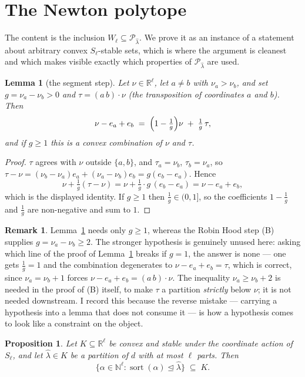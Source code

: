 \documentclass[11pt]{article}
\theoremstyle{plain}
\newtheorem{lem}[thm]{Lemma}
\newtheorem{prop}[thm]{Proposition}
\theoremstyle{definition}
\newtheorem{rem}[thm]{Remark}
\DeclareMathOperator{\srt}{sort}
\newcommand{\N}{\mathbb{N}}
\newcommand{\R}{\mathbb{R}}
\newcommand{\lhat}{\hat\lambda}
\newcommand{\Perm}{\mathcal{P}}
\begin{document}
\section{The Newton polytope}\label{sec:newton}

The content is the inclusion $W_\ell\subseteq\Perm_{\lhat}$. We prove it as an
instance of a statement about arbitrary convex $S_\ell$-stable sets, which is
where the argument is cleanest and which makes visible exactly which properties
of $\Perm_{\lhat}$ are used.

\begin{lem}[the segment step]\label{lem:segment}
Let $\nu\in\R^{\ell}$, let $a\ne b$ with $\nu_a>\nu_b$, and set
$g=\nu_a-\nu_b>0$ and $\tau=(a\,b)\cdot\nu$ (the transposition of coordinates
$a$ and $b$). Then
\[
  \nu-e_a+e_b\;=\;\Bigl(1-\tfrac{1}{g}\Bigr)\nu\;+\;\tfrac{1}{g}\,\tau ,
\]
and if $g\ge 1$ this is a convex combination of $\nu$ and $\tau$.
\end{lem}

\begin{proof}
$\tau$ agrees with $\nu$ outside $\{a,b\}$, and $\tau_a=\nu_b$, $\tau_b=\nu_a$,
so $\tau-\nu=(\nu_b-\nu_a)e_a+(\nu_a-\nu_b)e_b=g(e_b-e_a)$. Hence
\[
  \nu+\tfrac{1}{g}(\tau-\nu)=\nu+\tfrac{1}{g}\cdot g\,(e_b-e_a)=\nu-e_a+e_b,
\]
which is the displayed identity. If $g\ge 1$ then $\tfrac{1}{g}\in(0,1]$, so the
coefficients $1-\tfrac1g$ and $\tfrac1g$ are non-negative and sum to $1$.
\end{proof}

\begin{rem}\label{rem:gap1}
Lemma~\ref{lem:segment} needs only $g\ge 1$, whereas the Robin Hood step (B)
supplies $g=\nu_a-\nu_b\ge 2$. The stronger hypothesis is genuinely unused here:
asking which line of the proof of Lemma~\ref{lem:segment} breaks if $g=1$, the
answer is none --- one gets $\tfrac1g=1$ and the combination degenerates to
$\nu-e_a+e_b=\tau$, which is correct, since $\nu_a=\nu_b+1$ forces
$\nu-e_a+e_b=(a\,b)\cdot\nu$. The inequality $\nu_a\ge\nu_b+2$ is needed in the
proof of (B) itself, to make $\tau$ a partition \emph{strictly} below $\nu$; it
is not needed downstream. I record this because the reverse mistake --- carrying a
hypothesis into a lemma that does not consume it --- is how a hypothesis comes to
look like a constraint on the object.
\end{rem}

\begin{prop}\label{prop:minimal}
Let $K\subseteq\R^{\ell}$ be convex and stable under the coordinate action of
$S_\ell$, and let $\lhat\in K$ be a partition of $d$ with at most $\ell$ parts.
Then
\[
  \{\alpha\in\N^{\ell}:\srt(\alpha)\trianglelefteq\lhat\}\;\subseteq\;K .
\]
\end{prop}
\end{document}
